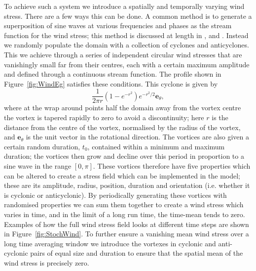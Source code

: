 \documentclass[12pt,a4paper]{report}
\begin{document}
To achieve such a system we introduce a spatially and temporally 
varying wind stress. There are a few  ways this can be done. A common method
is to generate a superposition of sine waves at various frequencies and 
phases as the stream function for the wind stress; this method is discussed at
length in \cite{koszalka2009dynamics}, \cite{Thomson2015} and \cite{brannigan2015seasonal}. 
Instead we randomly populate the domain
with a collection of cyclones and anticyclones. This we achieve through a series of
independent circular wind stresses that are vanishingly small far from their centres,
each with a certain maximum amplitude and defined through a continuous stream function.
The profile shown in 
Figure~\ref{fig:WindEg} satisfies these conditions. This cyclone is given by 
\begin{equation*}
\frac{1}{2\pi r}(1-e^{-r^{2}})e^{-r^{2}/2}\boldsymbol{e}_{\theta},
\end{equation*}
where at the wrap around points half the domain away from the vortex centre the vortex 
is tapered rapidly to zero to avoid a discontinuity; here $r$ is the distance from the centre of the vortex, normalised by the
radius of the vortex, and $\boldsymbol{e}_{\theta}$ is the unit vector in the 
rotational direction. 
  The vortices are also given a certain random duration, $t_{0}$, contained within a minimum and maximum duration; the vortices then
grow and decline over this period in proportion to a sine wave in the range $[0,\pi]$.
These vortices therefore have five properties which can be altered to 
create a stress field which can be implemented in the model; these are its
amplitude, radius, position, duration and orientation (i.e. whether it is cyclonic
or anticyclonic). By periodically generating these vortices with randomised properties
we can sum them together to create a wind stress which varies in time, and in the limit
of a long run time, the time-mean tends to zero.
Examples of how the full wind stress field looks at different
time steps are shown in Figure~\ref{fig:StochWind}. To further ensure a vanishing
mean wind stress over a long time averaging window we introduce the vortexes in cyclonic
and anti-cyclonic pairs of equal size and duration to ensure that the spatial mean
of the wind stress is precisely zero. 
\end{document}
